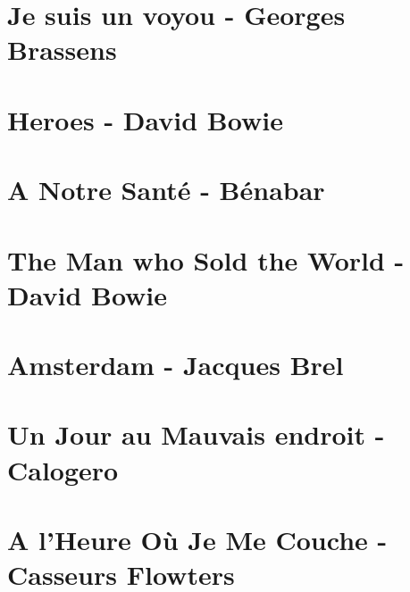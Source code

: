 \documentclass{guitartabs}
\begin{document}
\section{Je suis un voyou - Georges Brassens}
\begin{guitar}

\end{guitar}


\section*{Heroes - David Bowie}
\begin{guitar}

\end{guitar}

\section{A Notre Santé - Bénabar}
\begin{guitar}

\end{guitar}

\section*{The Man who Sold the World - David Bowie}
\begin{guitar}

\end{guitar}


\section{Amsterdam - Jacques Brel}
\begin{guitar}

\end{guitar}

\section{Un Jour au Mauvais endroit - Calogero}
\begin{guitar}

\end{guitar}

\section{A l'Heure Où Je Me Couche - Casseurs Flowters}
\begin{guitar}

\end{guitar}
\end{document}
